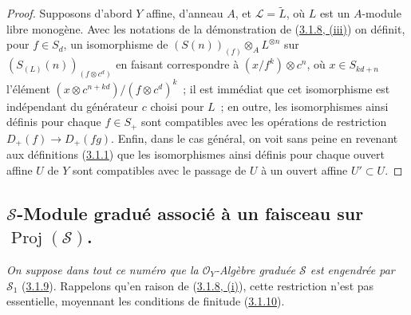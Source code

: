 \begin{proof}
Supposons d'abord $Y$ affine, d'anneau $A$, et
$\mathcal{L}=\widetilde{L}$, où $L$ est un $A$-module libre monogène. Avec les
notations de la démonstration de
(\hyperref[II.3.1.8-fr]{3.1.8, (iii)}) on définit, pour $f\in S_d$, un
isomorphisme de $(S(n))_{(f)}\otimes_A L^{\otimes n}$ sur
$(S_{(L)}(n))_{(f\otimes c^d)}$ en faisant correspondre à
$(x/f^k)\otimes c^n$, où $x\in S_{kd+n}$ l'élément
$(x\otimes c^{n+kd})/(f\otimes c^d)^k$~; il est immédiat
que cet isomorphisme est indépendant du générateur $c$ choisi pour $L$~; en
outre, les isomorphismes ainsi définis pour chaque $f\in S_+$ sont compatibles
avec les opérations de restriction $D_+(f)\to D_+(fg)$. Enfin, dans le cas
général, on voit sans peine en revenant aux définitions
(\hyperref[II.3.1.1-fr]{3.1.1}) que les isomorphismes ainsi définis pour
chaque ouvert affine $U$ de $Y$ sont compatibles avec le passage de $U$ à un
ouvert affine $U'\subset U$.
\end{proof}

\subsection{$\mathcal{S}$-Module gradué associé à un faisceau sur
$\operatorname{Proj}(\mathcal{S})$.}
\label{subsection:II.3.3-fr}

\emph{On suppose dans tout ce numéro que la $\mathcal{O}_Y$-Algèbre graduée
$\mathcal{S}$ est engendrée par $\mathcal{S}_1$}
(\hyperref[II.3.1.9-fr]{3.1.9}). Rappelons qu'en raison de
(\hyperref[II.3.1.8-fr]{3.1.8, (i)}), cette restriction n'est pas essentielle,
moyennant les conditions de finitude (\hyperref[II.3.1.10-fr]{3.1.10}).


